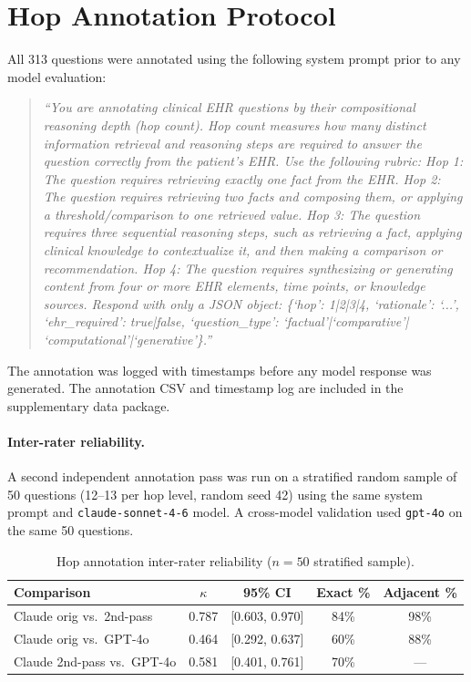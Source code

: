 \documentclass{article}
\begin{document}
\section{Hop Annotation Protocol}
\label{app:annotation}

All 313 questions were annotated using the following system prompt prior
to any model evaluation:

\begin{quote}
\small
\textit{``You are annotating clinical EHR questions by their compositional
reasoning depth (hop count). Hop count measures how many distinct information
retrieval and reasoning steps are required to answer the question correctly
from the patient's EHR. Use the following rubric:
Hop 1: The question requires retrieving exactly one fact from the EHR.
Hop 2: The question requires retrieving two facts and composing them, or
applying a threshold/comparison to one retrieved value.
Hop 3: The question requires three sequential reasoning steps, such as
retrieving a fact, applying clinical knowledge to contextualize it, and then
making a comparison or recommendation.
Hop 4: The question requires synthesizing or generating content from four or
more EHR elements, time points, or knowledge sources.
Respond with only a JSON object: \{`hop': 1|2|3|4, `rationale': `...',
`ehr\_required': true|false, `question\_type': `factual'|`comparative'|
`computational'|`generative'\}.''
}
\end{quote}

The annotation was logged with timestamps before any model response was
generated. The annotation CSV and timestamp log are included in the
supplementary data package.

\paragraph{Inter-rater reliability.}
A second independent annotation pass was run on a stratified random sample of
50 questions (12--13 per hop level, random seed 42) using the same system
prompt and \texttt{claude-sonnet-4-6} model. A cross-model validation used
\texttt{gpt-4o} on the same 50 questions.

\begin{table}[h]
\centering
\caption{Hop annotation inter-rater reliability ($n = 50$ stratified sample).}
\label{tab:hop_kappa}
\small
\begin{tabular}{lcccc}
\toprule
\textbf{Comparison} & \textbf{$\kappa$} & \textbf{95\% CI} & \textbf{Exact \%} & \textbf{Adjacent \%} \\
\midrule
Claude orig vs.\ 2nd-pass & 0.787 & [0.603, 0.970] & 84\% & 98\% \\
Claude orig vs.\ GPT-4o   & 0.464 & [0.292, 0.637] & 60\% & 88\% \\
Claude 2nd-pass vs.\ GPT-4o & 0.581 & [0.401, 0.761] & 70\% & --- \\
\bottomrule
\end{tabular}
\end{table}
\end{document}

